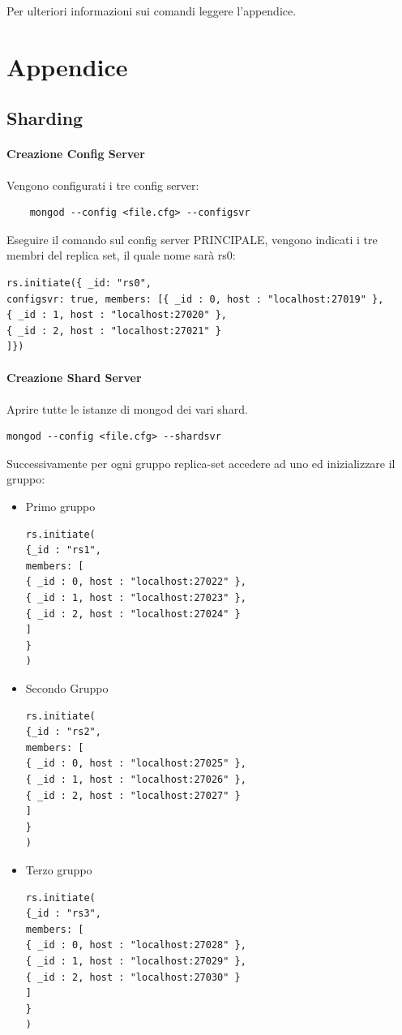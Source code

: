\documentclass[10pt, a4paper,openany]{article}
\begin{document}
Per ulteriori informazioni sui comandi leggere l'appendice.

\section*{Appendice}

\subsection*{Sharding}

\paragraph{Creazione Config Server\\}
Vengono configurati i tre config server:
\begin{Verbatim}
	mongod --config <file.cfg> --configsvr
\end{Verbatim}

Eseguire il comando sul config server PRINCIPALE, vengono indicati i tre membri del replica set, il quale nome sarà rs0:
\begin{Verbatim}
rs.initiate({ _id: "rs0", 
configsvr: true, members: [{ _id : 0, host : "localhost:27019" },
{ _id : 1, host : "localhost:27020" },
{ _id : 2, host : "localhost:27021" }
]})
\end{Verbatim}

\paragraph{Creazione Shard Server\\} Aprire tutte le istanze di mongod dei vari shard.

\begin{Verbatim}
mongod --config <file.cfg> --shardsvr
\end{Verbatim}

Successivamente per ogni gruppo replica-set accedere ad uno ed inizializzare il gruppo:
\begin{itemize}
	\item Primo gruppo
\begin{Verbatim}
rs.initiate(
{_id : "rs1",
members: [
{ _id : 0, host : "localhost:27022" },
{ _id : 1, host : "localhost:27023" },
{ _id : 2, host : "localhost:27024" }
]
}
)
\end{Verbatim}
	\item Secondo Gruppo
\begin{Verbatim}
rs.initiate(
{_id : "rs2",
members: [
{ _id : 0, host : "localhost:27025" },
{ _id : 1, host : "localhost:27026" },
{ _id : 2, host : "localhost:27027" }
]
}
)
\end{Verbatim}

	\item Terzo gruppo
\begin{Verbatim}
rs.initiate(
{_id : "rs3",
members: [
{ _id : 0, host : "localhost:27028" },
{ _id : 1, host : "localhost:27029" },
{ _id : 2, host : "localhost:27030" }
]
}
)
\end{Verbatim}

\end{itemize}
\end{document}

